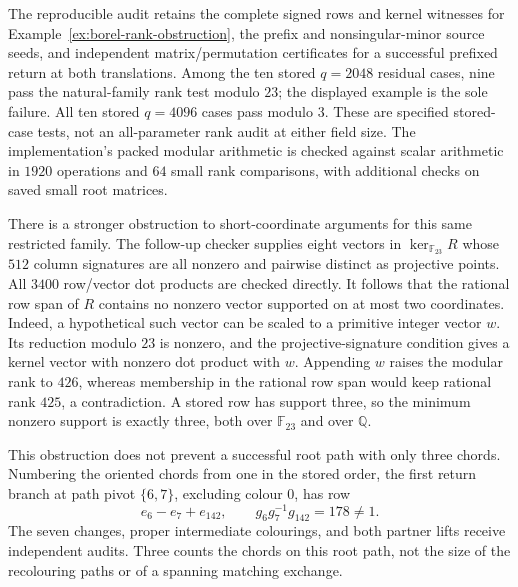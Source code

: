 \documentclass[11pt,a4paper]{article}
\theoremstyle{definition}
\theoremstyle{remark}
\begin{document}
The reproducible audit  retains the complete signed rows and kernel witnesses for Example~\ref{ex:borel-rank-obstruction}, the prefix and nonsingular-minor source seeds, and independent matrix/permutation certificates for a successful prefixed return at both translations.  Among the ten stored $q=2048$ residual cases, nine pass the natural-family rank test modulo $23$; the displayed example is the sole failure.  All ten stored $q=4096$ cases pass modulo $3$.  These are specified stored-case tests, not an all-parameter rank audit at either field size.  The implementation's packed modular arithmetic is checked against scalar arithmetic in $1920$ operations and $64$ small rank comparisons, with additional checks on saved small root matrices.

There is a stronger obstruction to short-coordinate arguments for this same restricted family.  The follow-up checker  supplies eight vectors in $\ker_{\mathbb F_{23}}R$ whose $512$ column signatures are all nonzero and pairwise distinct as projective points.  All $3400$ row/vector dot products are checked directly.  It follows that the rational row span of $R$ contains no nonzero vector supported on at most two coordinates.  Indeed, a hypothetical such vector can be scaled to a primitive integer vector $w$.  Its reduction modulo $23$ is nonzero, and the projective-signature condition gives a kernel vector with nonzero dot product with $w$.  Appending $w$ raises the modular rank to $426$, whereas membership in the rational row span would keep rational rank $425$, a contradiction.  A stored row has support three, so the minimum nonzero support is exactly three, both over $\mathbb F_{23}$ and over $\mathbb Q$.

This obstruction does not prevent a successful root path with only three chords.  Numbering the oriented chords from one in the stored order, the first return branch at path pivot $\{6,7\}$, excluding colour $0$, has row
\[
                 e_6-e_7+e_{142},\qquad
                 g_6g_7^{-1}g_{142}=178\ne1.
\]
The seven changes, proper intermediate colourings, and both partner lifts receive independent audits.  Three counts the chords on this root path, not the size of the recolouring paths or of a spanning matching exchange.
\end{document}
